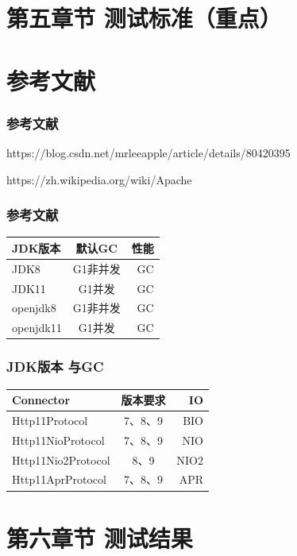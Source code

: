 \documentclass{beamer}
\begin{document}
\section{第五章节 测试标准（重点）}






\section{参考文献}

\begin{frame}[allowframebreaks]
\frametitle{参考文献}
\small


https://blog.csdn.net/mrleeapple/article/details/80420395

https://zh.wikipedia.org/wiki/Apache%
\end{frame}

\begin{frame}[allowframebreaks]
\frametitle{参考文献}
\centering
\begin{tabular}{|l|c|r|}
\hline 
\large	JDK版本 &  \large 默认GC&  \large 性能 \\
\hline 
JDK8 & G1非并发 &  GC \\
\hline 
JDK11 & G1并发 & GC \\
\hline 
openjdk8 & G1非并发& GC  \\
\hline 
openjdk11& G1并发 & GC \\
\hline
\end{tabular}
\end{frame}

\begin{frame}[allowframebreaks]
\frametitle{JDK版本 与GC}
\centering
\begin{tabular}{|l|c|r|}
\hline 
\large	Connector&  \large 版本要求&  \large IO \\
\hline 
Http11Protocol & 7、8、9 & BIO \\
\hline 
Http11NioProtocol & 7、8、9 & NIO \\
\hline 
Http11Nio2Protocol & 8、9& NIO2  \\
\hline 
Http11AprProtocol& 7、8、9 & APR \\
\hline
\end{tabular}
\end{frame}




\section{第六章节 测试结果}
\end{document}
